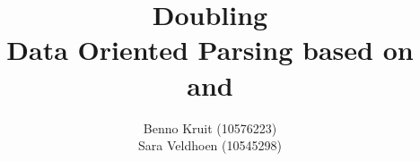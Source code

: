 \documentclass{article}
\title{Doubling \dops \\ 
{\normalsize Data Oriented Parsing based on \ddop and \dops}}
\author{Benno Kruit (10576223)\\
Sara Veldhoen (10545298)}
\begin{document}
\newcommand{\dops}[0]{DOP$ ^*$ }
\newcommand{\ddop}[0]{Double-DOP }


\maketitle








\end{document}
